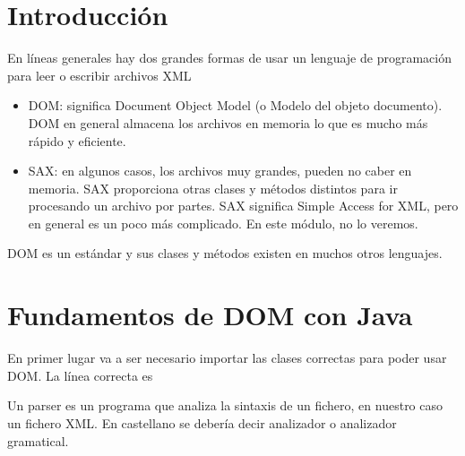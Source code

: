 \documentclass[letterpaper,10pt,spanish]{sphinxmanual}
\begin{document}
\section{Introducción}
\label{\detokenize{tema6:introduccion}}
En líneas generales hay dos grandes formas de usar un lenguaje de programación para leer o escribir archivos XML
\begin{itemize}
\item {} 
DOM: significa Document Object Model (o Modelo del objeto documento). DOM en general almacena los archivos en memoria lo que es mucho más rápido y eficiente.

\item {} 
SAX: en algunos casos, los archivos muy grandes, pueden no caber en memoria. SAX proporciona otras clases y métodos distintos para ir procesando un archivo por partes. SAX significa Simple Access for XML, pero en general es un poco más complicado. En este módulo, no lo veremos.

\end{itemize}

DOM es un estándar y sus clases y métodos existen en muchos otros lenguajes.


\section{Fundamentos de DOM con Java}
\label{\detokenize{tema6:fundamentos-de-dom-con-java}}
En primer lugar va a ser necesario importar las clases correctas para poder usar DOM. La línea correcta es

\begin{sphinxVerbatim}[commandchars=\\\{\}]
 
 
\end{sphinxVerbatim}

Un parser es un programa que analiza la sintaxis de un fichero, en nuestro caso un fichero XML. En castellano se debería decir analizador o analizador gramatical.
\end{document}
